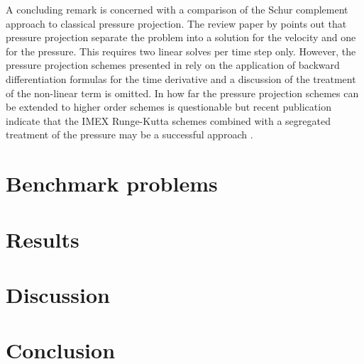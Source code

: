 \documentclass[review]{revtex4-1}
\begin{document}
A concluding remark is concerned with a comparison of the Schur complement approach to classical pressure projection. The review paper by \citeauthor{Guermond2006} points out that pressure projection separate the problem into a solution for the velocity and one for the pressure. This requires two linear solves per time step only. However, the pressure projection schemes presented in \cite{Guermond2006} rely on the application of backward differentiation formulas for the time derivative and a discussion of the treatment of the non-linear term is omitted. In how far the pressure projection schemes can be extended to higher order schemes is questionable but recent publication indicate that the IMEX Runge-Kutta schemes combined with a segregated treatment of the pressure may be a successful approach \cite{Ansorge2017,Colomes2015}.

\section{Benchmark problems\label{sec:BenchmarkProblems}}
\section{Results\label{sec:Results}}
\section{Discussion\label{sec:Discussion}}
\section{Conclusion\label{sec:Conclusion}}
\end{document}
